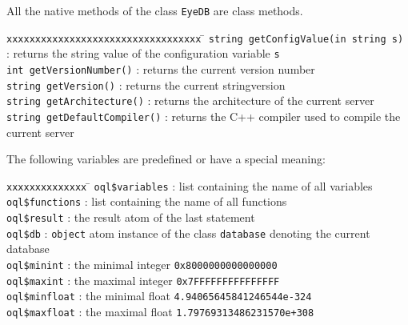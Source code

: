 All the native methods of the class \texttt{EyeDB} are class methods.

\begin{tabbing}
\texttt{xxxxxxxxxxxxxxxxxxxxxxxxxxxxxxxxxx} \= \kill
\texttt{string getConfigValue(in string s)}\> : returns the
string value of the configuration variable \texttt{s}\\
\texttt{int getVersionNumber()}\> : returns the \eyedb current version number\\
\texttt{string getVersion()}\> : returns the \eyedb current stringversion\\
\texttt{string getArchitecture()}\> : returns the architecture of the current server\\
\texttt{string getDefaultCompiler()}\> : returns the C++ compiler used to
compile the current server\\
\end{tabbing}

The following variables are predefined or have a special meaning:
\begin{tabbing}
\texttt{xxxxxxxxxxxxxx} \= \kill
\texttt{oql\$variables}\> : list containing the name of all variables\\
\texttt{oql\$functions}\> : list containing the name of all functions\\
\texttt{oql\$result}\> : the result atom of the last statement\\
\texttt{oql\$db}\> : \texttt{object} atom instance of the class
\texttt{database} denoting the current database\\
\texttt{oql\$minint}\> : the minimal integer \texttt{0x8000000000000000}\\
\texttt{oql\$maxint}\> : the maximal integer \texttt{0x7FFFFFFFFFFFFFFF}\\
\texttt{oql\$minfloat}\> : the minimal float \texttt{4.94065645841246544e-324}\\
\texttt{oql\$maxfloat}\> : the maximal float \texttt{1.79769313486231570e+308}\\
\end{tabbing}

